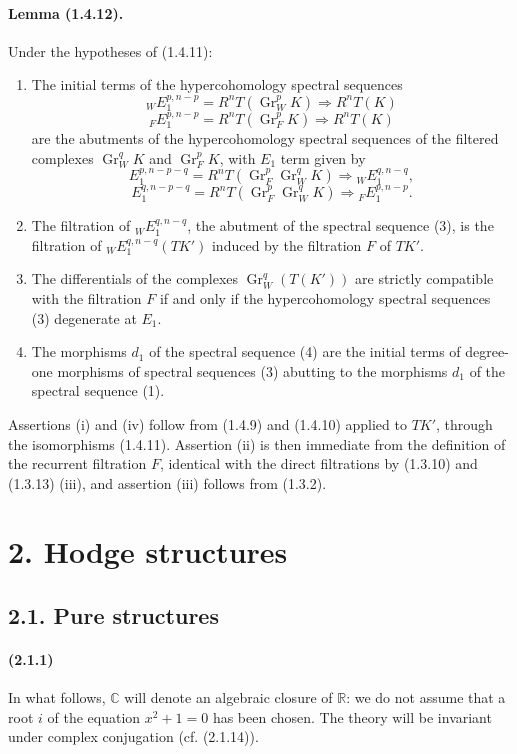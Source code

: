 \documentclass[10pt]{article}
\newcommand{\C}{\mathbb C}
\newcommand{\Gr}{\operatorname{Gr}}
\newcommand{\R}{\mathbb R}
\begin{document}
\paragraph{Lemma (1.4.12).} Under the hypotheses of (1.4.11):
\begin{enumerate}[label=(\roman*)]
\item The initial terms of the hypercohomology spectral sequences
\[
\tag{1}
{}_WE_1^{p,n-p}=R^nT(\Gr_W^pK)\Rightarrow R^nT(K)
\]
\[
\tag{2}
{}_FE_1^{p,n-p}=R^nT(\Gr_F^pK)\Rightarrow R^nT(K)
\]
are the abutments of the hypercohomology spectral sequences of the filtered complexes $\Gr_W^qK$ and $\Gr_F^pK$, with $E_1$ term given by
\[
\tag{3}
E_1^{p,n-p-q}=R^nT(\Gr_F^p\Gr_W^qK)\Rightarrow {}_WE_1^{q,n-q},
\]
\[
\tag{4}
E_1^{q,n-p-q}=R^nT(\Gr_F^p\Gr_W^qK)\Rightarrow {}_FE_1^{p,n-p}.
\]
\item The filtration of ${}_WE_1^{q,n-q}$, the abutment of the spectral sequence (3), is the filtration of ${}_WE_1^{q,n-q}(TK')$ induced by the filtration $F$ of $TK'$.
\item The differentials of the complexes $\Gr_W^q(T(K'))$ are strictly compatible with the filtration $F$ if and only if the hypercohomology spectral sequences (3) degenerate at $E_1$.
\item The morphisms $d_1$ of the spectral sequence (4) are the initial terms of degree-one morphisms of spectral sequences (3) abutting to the morphisms $d_1$ of the spectral sequence (1).
\end{enumerate}
Assertions (i) and (iv) follow from (1.4.9) and (1.4.10) applied to $TK'$, through the isomorphisms (1.4.11). Assertion (ii) is then immediate from the definition of the recurrent filtration $F$, identical with the direct filtrations by (1.3.10) and (1.3.13) (iii), and assertion (iii) follows from (1.3.2).

\section*{2. Hodge structures}
\subsection*{2.1. Pure structures}

\paragraph{(2.1.1)} In what follows, $\C$ will denote an algebraic closure of $\R$: we do not assume that a root $i$ of the equation $x^2+1=0$ has been chosen. The theory will be invariant under complex conjugation (cf. (2.1.14)).
\end{document}
